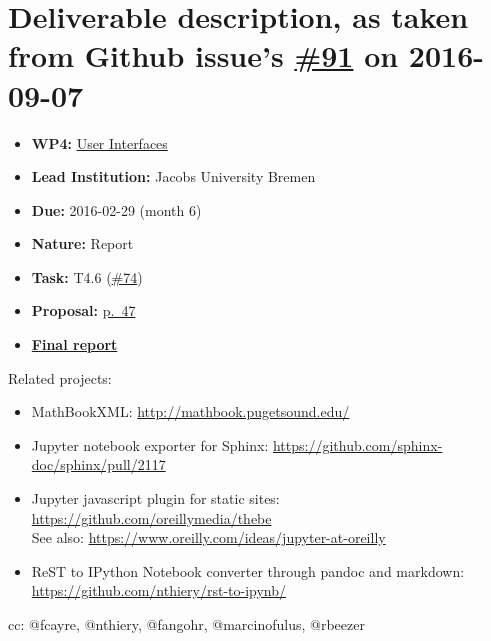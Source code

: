 \section*{\texorpdfstring{Deliverable description, as taken from Github
issue's
\href{https://github.com/OpenDreamKit/OpenDreamKit/issues/91}{\#91} on
2016-09-07}{Deliverable description, as taken from Github issue's \#91 on 2016-09-07}}\label{deliverable-description-as-taken-from-github-issues-91-on-2016-09-07}

\begin{itemize}
\tightlist
\item
  \textbf{WP4:}
  \href{https://github.com/OpenDreamKit/OpenDreamKit/tree/master/WP4}{User
  Interfaces}
\item
  \textbf{Lead Institution:} Jacobs University Bremen
\item
  \textbf{Due:} 2016-02-29 (month 6)
\item
  \textbf{Nature:} Report
\item
  \textbf{Task:} T4.6
  (\href{https://github.com/OpenDreamKit/OpenDreamKit/issues/74}{\#74})
\item
  \textbf{Proposal:}
  \href{https://github.com/OpenDreamKit/OpenDreamKit/raw/master/Proposal/proposal-www.pdf}{p.~47}
\item
  \textbf{\href{https://github.com/OpenDreamKit/OpenDreamKit/raw/master/WP4/D4.2/report-final.pdf}{Final
  report}}
\end{itemize}

Related projects:

\begin{itemize}
\tightlist
\item
  MathBookXML: \url{http://mathbook.pugetsound.edu/}
\item
  Jupyter notebook exporter for Sphinx:
  \url{https://github.com/sphinx-doc/sphinx/pull/2117}
\item
  Jupyter javascript plugin for static sites:
  \url{https://github.com/oreillymedia/thebe}\\
  See also: \url{https://www.oreilly.com/ideas/jupyter-at-oreilly}
\item
  ReST to IPython Notebook converter through pandoc and markdown:
  \url{https://github.com/nthiery/rst-to-ipynb/}
\end{itemize}

cc: @fcayre, @nthiery, @fangohr, @marcinofulus, @rbeezer

